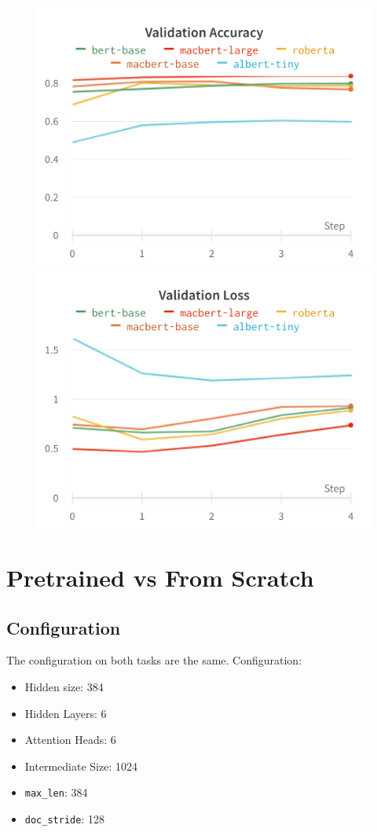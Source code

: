 \documentclass{homeworg}
\begin{document}
\begin{figure}[!htb]
\includegraphics[width=\linewidth]{charts/Section-9-Panel-2-tjpy87ij0}

\endminipage\hfill
{}
\includegraphics[width=\linewidth]{charts/Section-9-Panel-1-19njg3pxc}


\endminipage
\end{figure}
\newpage
\section{Pretrained vs From Scratch}
\subsection{Configuration}
The configuration on both tasks are the same.
Configuration:
\begin{itemize}
    \item Hidden size: 384
    \item Hidden Layers: 6
    \item Attention Heads: 6
    \item Intermediate Size: 1024
    \item \texttt{max\_len}: 384
    \item \texttt{doc\_stride}: 128
\end{itemize}
\end{document}
